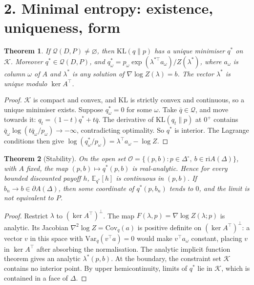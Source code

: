 \documentclass[11pt]{article}
\newtheorem{theorem}{Theorem}
\theoremstyle{definition}
\begin{document}
\section*{2. Minimal entropy: existence, uniqueness, form}
\begin{theorem}\label{thm:me}
If $\mathcal Q(D,P)\neq\varnothing$, then $\mathrm{KL}(q\|p)$ has a unique minimiser $q^*$ on $\mathcal K$. Moreover
$q^*\in\mathcal Q(D,P)$, and $q^*_\omega=p_\omega\exp(\lambda^{*\top}a_\omega)/Z(\lambda^*)$, where $a_\omega$ is column
$\omega$ of $A$ and $\lambda^*$ is any solution of $\nabla\log Z(\lambda)=b$. The vector $\lambda^*$ is unique modulo
$\ker A^\top$.
\end{theorem}
\begin{proof}
$\mathcal K$ is compact and convex, and KL is strictly convex and continuous, so a unique minimiser exists. Suppose
$q^*_\omega=0$ for some $\omega$. Take $\bar q\in\mathcal Q$, and move towards it: $q_t=(1-t)q^*+t\bar q$. The derivative of
$\mathrm{KL}(q_t\|p)$ at $0^+$ contains $\bar q_\omega\log(t\bar q_\omega/p_\omega)\to-\infty$, contradicting optimality. So
$q^*$ is interior. The Lagrange conditions then give $\log(q^*_\omega/p_\omega)=\lambda^\top a_\omega-\log Z$.
\end{proof}

\begin{theorem}[Stability]\label{thm:stab}
On the open set $\mathcal O=\{(p,b):p\in\Delta^\circ,\ b\in\mathrm{ri}A(\Delta)\}$, with $A$ fixed, the map
$(p,b)\mapsto q^*(p,b)$ is real-analytic. Hence for every bounded discounted payoff $h$, $\mathbb E_{q^*}[h]$ is continuous in
$(p,b)$. If $b_n\to b\in\partial A(\Delta)$, then some coordinate of $q^*(p,b_n)$ tends to $0$, and the limit is not equivalent to $P$.
\end{theorem}
\begin{proof}
Restrict $\lambda$ to $(\ker A^\top)^\perp$. The map $F(\lambda,p)=\nabla\log Z(\lambda;p)$ is analytic. Its Jacobian
$\nabla^2\log Z=\mathrm{Cov}_{q}(a)$ is positive definite on $(\ker A^\top)^\perp$: a vector $v$ in this space with
$\mathrm{Var}_q(v^\top a)=0$ would make $v^\top a_\omega$ constant, placing $v$ in $\ker A^\top$ after absorbing the
normalisation. The analytic implicit function theorem gives an analytic $\lambda^*(p,b)$. At the boundary, the
constraint set $\mathcal K$ contains no interior point. By upper hemicontinuity, limits of $q^*$ lie in $\mathcal K$, which
is contained in a face of $\Delta$.
\end{proof}
\end{document}
